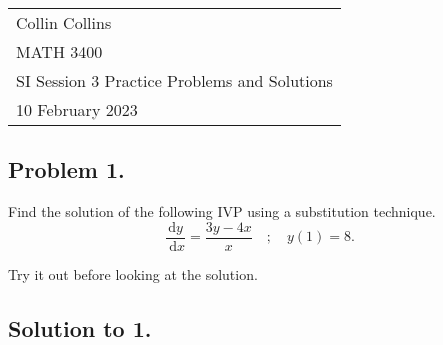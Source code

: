 \documentclass[a4paper,12pt]{article}
\begin{document}

\thispagestyle{empty}

\begin{tabular}{p{15.5cm}}
\\ Collin Collins \\
MATH 3400\\
SI Session 3 Practice Problems and Solutions\\
10 February 2023 \\
\hline

\end{tabular} 

\subsection*{Problem 1.}

Find the solution of the following IVP using a substitution technique.
$$ \frac{\mathrm{d} y}{\mathrm{~d} x}=\frac{3 y-4 x}{x} \quad;\quad y(1)=8.$$

Try it out before looking at the solution.

\pagebreak

\subsection*{Solution to 1.}
\end{document}
